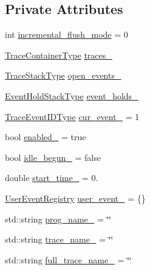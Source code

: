 \subsection*{Private Attributes}
\begin{DoxyCompactItemize}
\item 
int \hyperlink{structvt_1_1trace_1_1_trace_a0f00be1050ef823347cf2d5daaa0e1c4}{incremental\+\_\+flush\+\_\+mode} = 0
\item 
\hyperlink{structvt_1_1trace_1_1_trace_a9d07ee9d9e92f63674da9954cfe9830b}{Trace\+Container\+Type} \hyperlink{structvt_1_1trace_1_1_trace_aa1bf33a64015c5a67cb7b6f8a8087d67}{traces\+\_\+}
\item 
\hyperlink{structvt_1_1trace_1_1_trace_af27d223028d10a196680513defcef3d6}{Trace\+Stack\+Type} \hyperlink{structvt_1_1trace_1_1_trace_aa115f04475f49fbb780f504560c46367}{open\+\_\+events\+\_\+}
\item 
\hyperlink{structvt_1_1trace_1_1_trace_a727542f4171681f2ef03df2c3abce04c}{Event\+Hold\+Stack\+Type} \hyperlink{structvt_1_1trace_1_1_trace_a48ea31a71be22303456facfc1bb86cda}{event\+\_\+holds\+\_\+}
\item 
\hyperlink{namespacevt_1_1trace_a64a7185f3e102df8d8258f263ccd1582}{Trace\+Event\+I\+D\+Type} \hyperlink{structvt_1_1trace_1_1_trace_a602b4a23bc05392194862fe61333c5dd}{cur\+\_\+event\+\_\+} = 1
\item 
bool \hyperlink{structvt_1_1trace_1_1_trace_a632f07e447cc81aaeeb66e786944a5c5}{enabled\+\_\+} = true
\item 
bool \hyperlink{structvt_1_1trace_1_1_trace_a4a15f7071c60dc69afa392a335b28d05}{idle\+\_\+begun\+\_\+} = false
\item 
double \hyperlink{structvt_1_1trace_1_1_trace_a1ab1dc5822421f7ff32e0de299a56d65}{start\+\_\+time\+\_\+} = 0.
\item 
\hyperlink{structvt_1_1trace_1_1_user_event_registry}{User\+Event\+Registry} \hyperlink{structvt_1_1trace_1_1_trace_a5850927ef50c2074b82dd5a18852850e}{user\+\_\+event\+\_\+} = \{\}
\item 
std\+::string \hyperlink{structvt_1_1trace_1_1_trace_a23105afa15b4dc435aa047f76305ece7}{prog\+\_\+name\+\_\+} = \char`\"{}\char`\"{}
\item 
std\+::string \hyperlink{structvt_1_1trace_1_1_trace_a4acd447be1327ebc5c3df38d5a40e138}{trace\+\_\+name\+\_\+} = \char`\"{}\char`\"{}
\item 
std\+::string \hyperlink{structvt_1_1trace_1_1_trace_a5304514e96243ad75d8e2d775eaf40c5}{full\+\_\+trace\+\_\+name\+\_\+} = \char`\"{}\char`\"{}

\end{DoxyCompactItemize}
